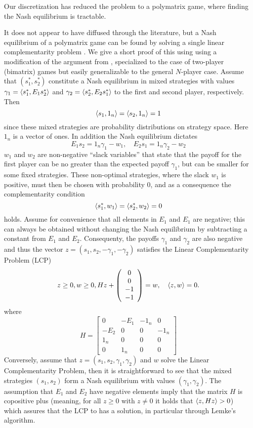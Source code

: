 Our discretization has reduced the problem to a polymatrix game, where finding the Nash equilibrium is tractable.

It does not appear to have diffused through the literature, but a Nash equilibrium of a polymatrix game can be found by solving a single linear complementarity problem \citep{miller1991copositive}. We give a short proof of this using using a modification of the argument from \citep{miller1991copositive}, specialized to the case of two-player (bimatrix) games but easily generalizable to the general $N$-player case. Assume that $(s^*_1,s^*_2)$ constitute a Nash equilibrium in mixed strategies with values $\gamma_1 = \left \langle s^*_1,E_1 s^*_2 \right \rangle$ and  $\gamma_2 = \left \langle s^*_2,E_2 s^*_1 \right \rangle$ to the first and second player, respectively. Then
\[
  \left \langle s_1,1_n \right \rangle =
  \left \langle s_2,1_n \right \rangle =
  1
\]
since these mixed strategies are probability distributions on strategy space. Here $1_n$ is a vector of ones. In addition the Nash equilibrium dictates
\[
  E_1 s_2 = 1_n \gamma_1 - w_1
  ,\quad
  E_2 s_1 = 1_n \gamma_2  - w_2
\]
$w_1$ and $w_2$ are non-negative ``slack variables'' that state that the payoff for the first player can be no greater than the expected payoff $\gamma_1$, but can be smaller for some fixed strategies. These non-optimal strategies, where the slack $w_1$ is positive, must then be chosen with probability 0, and as a consequence the complementarity condition
\[
  \left \langle s^*_1,w_1 \right \rangle =   \left \langle s^*_2,w_2 \right \rangle = 0
\]
holds. Assume for convenience that all elements in $E_1$ and $E_1$ are negative; this can always be obtained without changing the Nash equilibrium by subtracting a constant from $E_1$ and $E_2$. Consequenty, the payoffs $\gamma_1$ and $\gamma_2$ are also negative and thus the vector $z = (s_1,s_2,-\gamma_1,-\gamma_2)$ satisfies the Linear Complementarity Problem (LCP)
\begin{equation}
  z \geq 0,
  w \geq 0 ,
  H
  z
  +
  \left(
    \begin{array}{c}
      0 \\
      0 \\
      -1 \\
      -1
    \end{array}
  \right)
  =
  w
  ,
  \quad
  \left \langle z,w \right \rangle = 0
  .  \label{eq:lcp}
\end{equation}
where
\[
  H =
  \left[
    \begin{array}{cccc}
      0 & -E_1 & -1_n & 0 \\ -E_2 & 0 & 0 & -1_n \\
      1_n & 0 & 0 & 0 \\
      0 & 1_n & 0 & 0
    \end{array}
  \right]
\]
Conversely, assume that $z=(s_1,s_2,\gamma_1,\gamma_2)$ and $w$ solve the Linear Complementarity Problem, then it is straightforward to see that the mixed strategies $(s_1,s_2)$ form a Nash equilibrium with values $(\gamma_1,\gamma_2)$. The assumption that $E_1$ and $E_2$ have negative elements imply that the matrix $H$ is copositive plus (meaning, for all $z\geq0$ with $z\neq0$ it holds that $\left \langle z,Hz \right \rangle>0$) which assures that the LCP to has a solution, in particular through Lemke's algorithm.

